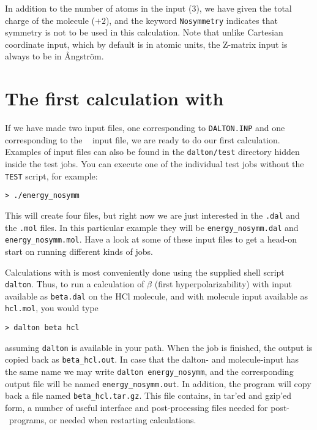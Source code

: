 In addition to the number of atoms in the input (3), we have given the
total charge of the
molecule ($+2$), and the keyword \verb|Nosymmetry| indicates that
symmetry is not to be used in this calculation. Note that
unlike Cartesian coordinate input, which by default is in atomic units, the
Z-matrix input is always to be in \AA ngstr\"{o}m.

\section{The first calculation with {\dalton}}\label{sec:firstcalc}

If we have made two input files, one corresponding to
\verb|DALTON.INP| and one corresponding to the \mol\
 input file, we
are ready to do our first calculation. Examples of input files can
also be found in the \verb|dalton/test| directory hidden inside the
test jobs. You can execute one of the individual test jobs
without the \verb|TEST| script, for example:
\begin{verbatim}
> ./energy_nosymm
\end{verbatim}
This will create four files, but right now we are just interested in
the \verb|.dal| and the \verb|.mol| files. In this particular example
they will be \verb|energy_nosymm.dal| and
\verb|energy_nosymm.mol|. Have a look at some of these input files to
get a head-on start on running different kinds of {\dalton} jobs.

Calculations with {\dalton} is most conveniently done using the
supplied shell script \verb|dalton|. Thus,
to run a calculation of $\beta$ (first
hyperpolarizability) 
with input available as \verb|beta.dal| on the HCl molecule, and with
molecule input available as \verb|hcl.mol|, you would type

\begin{verbatim}
> dalton beta hcl
\end{verbatim}
assuming \verb|dalton| is available in your path. When the job is
finished, the output is copied back as \verb|beta_hcl.out|. In case that the
dalton- and molecule-input has the same name we may write
\verb|dalton energy_nosymm|, and the corresponding output file will
be named \verb|energy_nosymm.out|. In addition, the program will copy
back a file named \verb|beta_hcl.tar.gz|. This file contains, in
tar'ed and gzip'ed form, a number of useful interface and
post-processing files needed for post-\dalton\ programs, or needed when
restarting calculations.

